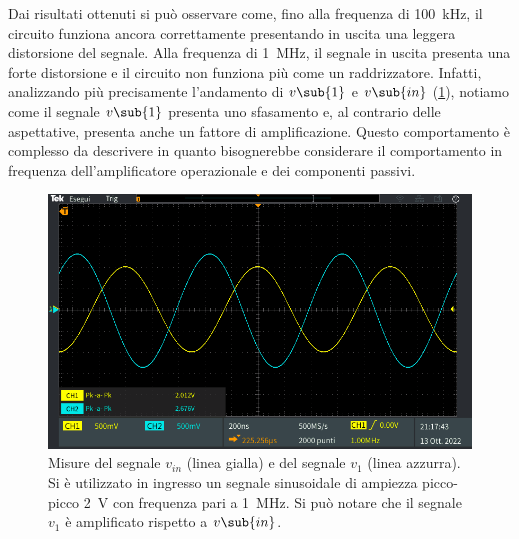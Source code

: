 \noindent
Dai risultati ottenuti si può osservare come, fino alla frequenza di \SI{100}{\kilo\hertz}, il circuito funziona ancora correttamente presentando in uscita una leggera distorsione del segnale. Alla frequenza di \SI{1}{\mega\hertz}, il segnale in uscita presenta una forte distorsione e il circuito non funziona più come un raddrizzatore. Infatti, analizzando più precisamente l'andamento di $v\sub{1}$ e $v\sub{in}$ (\Fig\ref{fig:analisi_circuito_3_3}), notiamo come il segnale $v\sub{1}$ presenta uno sfasamento e, al contrario delle aspettative, presenta anche un fattore di amplificazione. Questo comportamento è complesso da descrivere in quanto bisognerebbe considerare il comportamento in frequenza dell'amplificatore operazionale e dei componenti passivi.
\begin{figure}[h]
	\centering
	\includegraphics[width=1\linewidth]{./ImageFiles/Laboratorio 2/TEK00050}
	\caption{Misure del segnale $v_{in}$ (linea gialla) e del segnale $v_{1}$ (linea azzurra). Si è utilizzato in ingresso un segnale sinusoidale di ampiezza picco-picco \SI{2}{\volt} con frequenza pari a \SI{1}{\mega\hertz}. Si può notare che il segnale $v_{1}$ è amplificato rispetto a $v\sub{in}$.}
	\label{fig:analisi_circuito_3_3}
\end{figure}